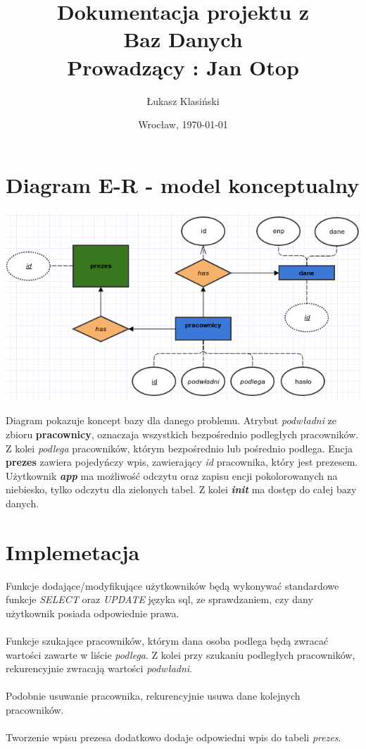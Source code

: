 \documentclass[11pt, wide]{article}
\author{Łukasz Klasiński}
\date{Wrocław, \today}
\title{\LARGE\textbf{Dokumentacja projektu z \\Baz Danych\\}
    Prowadzący : Jan Otop}
\begin{document}
    \maketitle
    \thispagestyle{empty}
    \section{Diagram E-R - model konceptualny}
    \includegraphics[width=\textwidth]{er}    

    Diagram pokazuje koncept bazy dla danego problemu. Atrybut \textit{podwładni}
    ze zbioru \textbf{pracownicy}, oznaczaja wszystkich bezpośrednio podległych pracowników. Z kolei
    \textit{podlega} pracowników, którym bezpośrednio lub pośrednio podlega. 
    Encja \textbf{prezes} zawiera pojedyńczy wpis, zawierający \textit{id} pracownika, który
    jest prezesem.\\

    Użytkownik \textbf{\textit{app}} ma możliwość odczytu oraz zapisu encji pokolorowanych
    na niebiesko, tylko odczytu dla zielonych tabel. Z kolei \textbf{\textit{init}} ma dostęp do całej bazy danych.

    \section{Implemetacja}
    Funkcje dodające/modyfikujące użytkowników będą wykonywać standardowe
    funkcje \textit{SELECT} oraz \textit{UPDATE} języka sql, ze sprawdzaniem, czy 
    dany użytkownik posiada odpowiednie prawa.\\\\       
    Funkcje szukające pracowników, którym dana osoba podlega będą zwracać wartości zawarte w liście \textit{podlega}. 
    Z kolei przy szukaniu podległych pracowników, rekurencyjnie zwracają wartości \textit{podwładni}.\\\\
    Podobnie usuwanie pracownika, rekurencyjnie usuwa dane kolejnych pracowników.\\\\
    Tworzenie wpisu prezesa dodatkowo dodaje odpowiedni wpis do tabeli \textit{prezes}.
\end{document}

